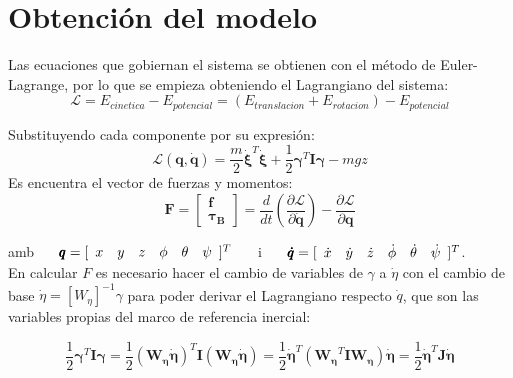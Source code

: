 \documentclass[twoside,11pt]{report}
\begin{document}
\section{Obtención del modelo}
Las ecuaciones que gobiernan el sistema se obtienen con el método de Euler-Lagrange, por lo que se empieza obteniendo el Lagrangiano del sistema:
\begin{equation}
\mathcal{L}=E_{cinetica} - E_{potencial} = (E_{translacion}+E_{rotacion})-E_{potencial}
\end{equation}

Substituyendo cada componente por su expresión:
\begin{equation}
\mathcal{L}(\pmb{q},\pmb{\dot{q}})=\frac{m}{2} \pmb{\dot{\xi}}^T \pmb{\dot{\xi}} + \frac{1}{2}\pmb{\gamma}^{T}\pmb{I}\pmb{\gamma} - mgz
\end{equation}
Es encuentra el vector de fuerzas y  momentos:
\begin{equation}
\pmb{F}=\left[ \begin{array}{c}
\pmb{f} \\
\pmb{\tau_B}
\end{array} \right] = \frac{d}{dt}\left(\frac{\partial \mathcal{L}}{\partial \pmb{\dot{q}}}\right)-\frac{\partial\mathcal{L}}{\partial \pmb{q}}
\end{equation}

amb $ \hspace{0.5cm} \pmb{q}=[\begin{array}{cccccc}
x & y & z & \phi & \theta & \psi
\end{array} ]^{T} \hspace{0.5cm}$ i $ \hspace{0.5cm} \pmb{\dot{q}}=[\begin{array}{cccccc}
\dot{x} & \dot{y} & \dot{z} & \dot{\phi} & \dot{\theta} & \dot{\psi}
\end{array} ]^{T}$.\\

En calcular $F$ es necesario hacer el cambio de variables de $\gamma$ a $\dot{\eta}$ con el cambio de base $\dot{\eta}=\left[ W_\eta \right]^{-1} \gamma$ para poder derivar el Lagrangiano respecto $\dot{q}$, que son las variables propias del marco de referencia inercial:

\begin{equation}
\frac{1}{2}\pmb{\gamma}^{T}\pmb{I}\pmb{\gamma} = \frac{1}{2}(\pmb{W_\eta} \pmb{\dot{\eta}})^{T}\pmb{I}(\pmb{W_\eta} \pmb{\dot{\eta}}) = \frac{1}{2}\pmb{\dot{\eta}}^{T}(\pmb{W_\eta} ^{T}\pmb{I}\pmb{W_\eta})\pmb{\dot{\eta}} = \frac{1}{2}\pmb{\dot{\eta}}^{T}\pmb{J}\pmb{\dot{\eta}}
\end{equation}
\end{document}
